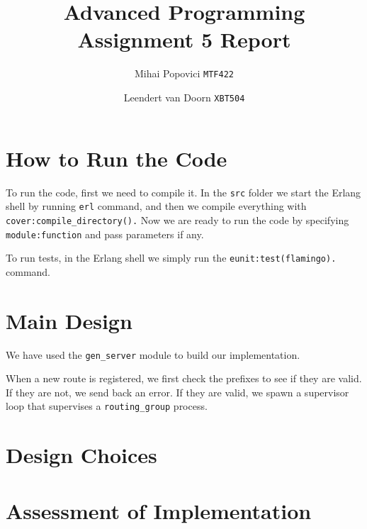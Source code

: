 \documentclass{article}
\title{Advanced Programming Assignment 5 Report}
\author{Mihai Popovici \texttt{MTF422} \and Leendert van Doorn \texttt{XBT504}}
\begin{document}
	
	\maketitle	
	
	\section{How to Run the Code}
	To run the code, first we need to compile it. In the \texttt{src} folder we start the Erlang shell by running \texttt{erl} command, and then we compile everything with \texttt{cover:compile\_directory().}
	Now we are ready to run the code by specifying \texttt{module:function} and pass parameters if any.
	
	To run tests, in the Erlang shell we simply run the \texttt{eunit:test(flamingo).} command.
	
	\section{Main Design}
	We have used the \texttt{gen\_server} module to build our implementation. 
	
	When a new route is registered, we first check the prefixes to see if they are valid. If they are not, we send back an error. If they are valid, we spawn a supervisor loop that supervises a \texttt{routing\_group} process. 
	
	
	
	
	
	
	
	
	
	\section{Design Choices}

	
	\section{Assessment of Implementation}
	
	
\end{document}
